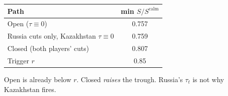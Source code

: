 \begin{center}
\small
{}
\label{tab:diversion}
\begin{tabular}{lc}
\toprule
Path & min \(S/S^{\mathrm{calm}}\) \\
\midrule
Open (\(\tau\equiv 0\)) & 0.757 \\
Russia cuts only, Kazakhstan \(\tau\equiv 0\) & 0.759 \\
Closed (both players' cuts) & 0.807 \\
Trigger \(r\) & 0.85 \\
\bottomrule
\end{tabular}
\end{center}
\vspace{0.4em}
{\small Open is already below \(r\). Closed \emph{raises} the trough.
Russia's \(\tau_t\) is not why Kazakhstan fires.}
\vspace{0.6em}
